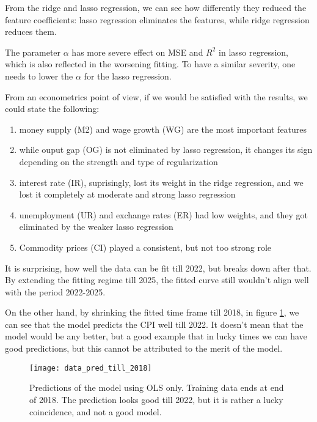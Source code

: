 \documentclass{article}
\begin{document}
From the ridge and lasso regression,
we can see how differently they reduced the feature coefficients:
lasso regression eliminates the features, while ridge regression reduces them.

The parameter $\alpha$ has more severe effect on MSE and $R^2$ in lasso regression,
which is also reflected in the worsening fitting. To have a similar severity,
one needs to lower the $\alpha$ for the lasso regression.

From an econometrics point of view,
if we would be satisfied with the results,
we could state the following:
\begin{enumerate}
      \item money supply (M2) and wage growth (WG) are the most important features
      \item while ouput gap (OG) is not eliminated by lasso regression,
            it changes its sign depending on the strength and type of regularization
      \item interest rate (IR), suprisingly, lost its weight in the ridge regression,
            and we lost it completely at moderate and strong lasso regression
      \item unemployment (UR) and exchange rates (ER) had low weights,
            and they got eliminated by the weaker lasso regression
      \item Commodity prices (CI) played a consistent, but not too strong role
\end{enumerate}

It is surprising, how well the data can be fit till 2022, but breaks down after that.
By extending the fitting regime till 2025,
the fitted curve still wouldn't align well with the
period 2022-2025.

On the other hand, by shrinking the fitted time frame till 2018,
in figure \ref{fig:ridge_predictions_2018},
we can see that the model predicts the CPI well till 2022.
It doesn't mean that the model would be any better,
but a good example that in lucky times we can have good predictions,
but this cannot be attributed to the merit of the model.

\begin{figure}
      \centering
      \texttt{[image: data\_pred\_till\_2018]}
      \caption{Predictions of the model using OLS only.
            Training data ends at end of 2018.
            The prediction looks good till 2022,
            but it is rather a lucky coincidence,
            and not a good model.}
      \label{fig:ridge_predictions_2018}
\end{figure}
\end{document}
